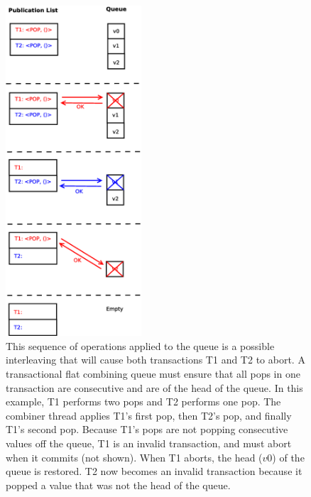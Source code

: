 \begin{figure}[H]
\centering
\includegraphics[width=0.45\textwidth]{fcqueue_publist}
    \caption[Invalid interleaving of pop requests in the flat combining queue]{This sequence of operations applied to the queue is a possible interleaving that will cause both transactions T1 and T2 to abort. A transactional flat combining queue must ensure that all pops in one transaction are consecutive and are of the head of the queue. In this example, T1 performs two pops and T2 performs one pop. The combiner thread applies T1's first pop, then T2's pop, and finally T1's second pop. Because T1's pops are not popping consecutive values off the queue, T1 is an invalid transaction, and must abort when it commits (not shown). When T1 aborts, the head ($v0$) of the queue is restored. T2 now becomes an invalid transaction because it popped a value that was not the head of the queue.}
\label{fig:fcqueue_publist}
\end{figure}


